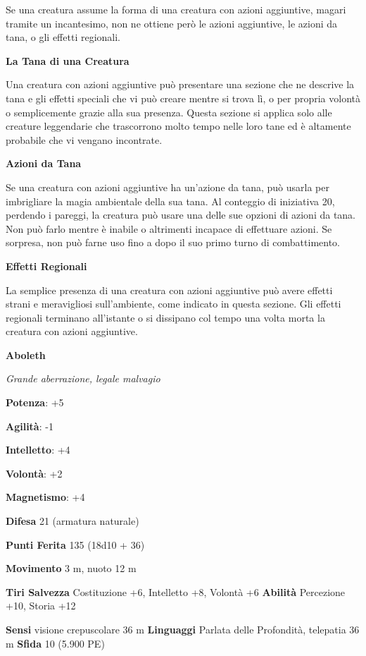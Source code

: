 \begin{multicols}{2}
Se una creatura assume la forma di una creatura con azioni aggiuntive, magari tramite un incantesimo, non ne  ottiene però le azioni aggiuntive, le azioni da tana, o  gli effetti regionali.

\textbf{La Tana di una Creatura}

Una creatura con azioni aggiuntive può presentare una sezione che ne descrive la tana e gli effetti speciali che vi può  creare mentre si trova lì, o per propria volontà o  semplicemente grazie alla sua presenza. Questa  sezione si applica solo alle creature leggendarie che  trascorrono molto tempo nelle loro tane ed è altamente  probabile che vi vengano incontrate.

\textbf{Azioni da Tana}

Se una creatura con azioni aggiuntive ha un'azione da tana, può  usarla per imbrigliare la magia ambientale della sua  tana. Al conteggio di iniziativa 20, perdendo i pareggi,  la creatura può usare una delle sue opzioni di azioni da  tana. Non può farlo mentre è inabile o altrimenti  incapace di effettuare azioni. Se sorpresa, non può  farne uso fino a dopo il suo primo turno di combattimento.

\textbf{Effetti Regionali}

La semplice presenza di una creatura con azioni aggiuntive può  avere effetti strani e meravigliosi sull'ambiente, come  indicato in questa sezione. Gli effetti regionali terminano all'istante o si dissipano col tempo una volta  morta la creatura con azioni aggiuntive.

\pagebreak

\textbf{Aboleth}

\emph{Grande aberrazione, legale malvagio}

\textbf{Potenza}: +5

\textbf{Agilità}: -1

\textbf{Intelletto}: +4

\textbf{Volontà}: +2

\textbf{Magnetismo}: +4

\textbf{Difesa} 21 (armatura naturale)

\textbf{Punti Ferita} 135 (18d10 + 36)

\textbf{Movimento} 3 m, nuoto 12 m

\textbf{Tiri Salvezza} Costituzione +6, Intelletto +8, Volontà +6
\textbf{Abilità} Percezione +10, Storia +12

\textbf{Sensi} visione crepuscolare 36 m
\textbf{Linguaggi} Parlata delle Profondità, telepatia 36 m
\textbf{Sfida} 10 (5.900 PE)


\end{multicols}
